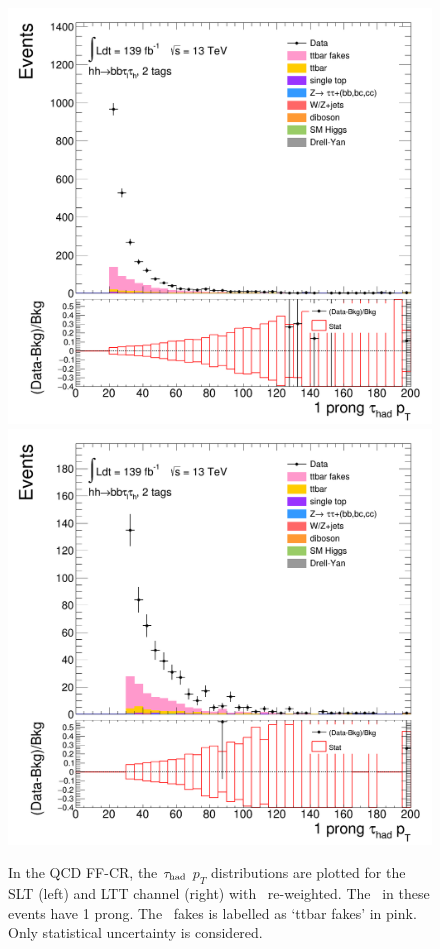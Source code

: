 \begin{figure}[htbp]
\centering
\includegraphics[width=.45\textwidth]{DiHiggs/plots/FF_CRs/InvCR_SLT/HNone/BDTVarsHighMbb/2/C_2tag2pjet_0ptv_TauPt1P.png}
\includegraphics[width=.45\textwidth]{DiHiggs/plots/FF_CRs/InvCR_LTT/HNone/BDTVarsHighMbb/2/C_2tag2pjet_0ptv_TauPt1P.png}\\
\caption{In the QCD FF-CR, the $\tau_{\mathrm{had}}$ $p_T$ distributions are plotted 
for the SLT (left) and LTT channel (right) 
with \ttbar\ re-weighted.
The \tauhad\ in these events have 1 prong. 
The \ttbar\ fakes is labelled as `ttbar fakes' in pink.
Only statistical uncertainty is considered.}
\label{fig:InvCR_1}
\end{figure} 


